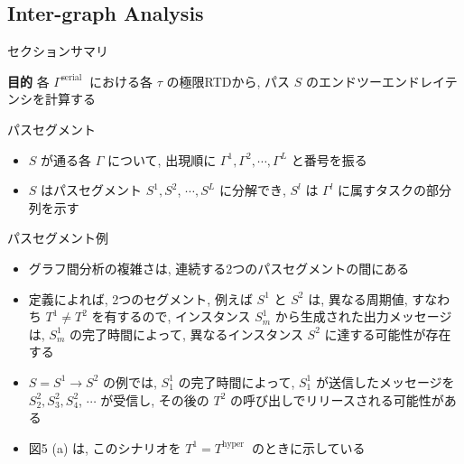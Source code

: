 \subsection{Inter-graph Analysis}
\label{ssec: inter-graph analysis}

\begin{frame}{セクションサマリ}
    \begin{itembox}[l]{\textbf{目的}}
        各 $\Gamma^{\text {serial }}$ における各 $\tau$ の極限RTDから, パス $S$ のエンドツーエンドレイテンシを計算する
    \end{itembox}
\end{frame}

\begin{frame}{パスセグメント}
    \begin{itemize}
        \item $S$ が通る各 $\Gamma$ について, 出現順に $\Gamma^{1}, \Gamma^{2}, \cdots, \Gamma^{L}$ と番号を振る
        \item $S$ はパスセグメント $S^{1}, S^{2}$, $\cdots, S^{L}$ に分解でき, $S^{l}$ は $\Gamma^{l}$ に属すタスクの部分列を示す
    \end{itemize}
\end{frame}

\begin{frame}{パスセグメント例}
\end{frame}

\begin{frame}{}
    \begin{itemize}
        \item グラフ間分析の複雑さは, 連続する2つのパスセグメントの間にある
        \item 定義によれば, 2つのセグメント, 例えば $S^{1}$ と $S^{2}$ は, 異なる周期値, すなわち $T^{1} \neq T^{2}$ を有するので, インスタンス $S_{m}^{1}$ から生成された出力メッセージは, $S_{m}^{1}$ の完了時間によって, 異なるインスタンス $S^{2}$ に達する可能性が存在する
        \item $S=S^{1} \rightarrow S^{2}$ の例では, $S_{1}^{1}$ の完了時間によって, $S_{1}^{1}$ が送信したメッセージを $S_{2}^{2}, S_{3}^{2}, S_{4}^{2}$, $\cdots$ が受信し, その後の $T^{2}$ の呼び出しでリリースされる可能性がある
        \item 図5 (a) は, このシナリオを $T^{1}=T^{\text {hyper }}$ のときに示している
    \end{itemize}
\end{frame}

